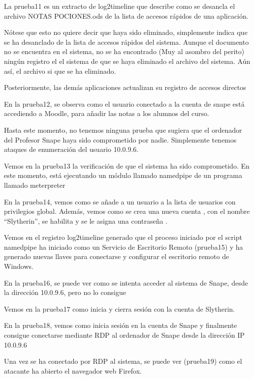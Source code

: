 La prueba11 es un extracto de log2timeline que describe como se desancla el archivo NOTAS POCIONES.ods de la lista de accesos rápidos de una aplicación.

Nótese que esto no quiere decir que haya sido eliminado, simplemente indica que se ha desanclado de la lista de accesos rápidos del sistema. 
Aunque el documento no se encuentra en el sistema, no se ha encontrado (Muy al asombro del perito) ningún registro el el sistema de que se haya eliminado el archivo del sistema. Aún así, el archivo si que se ha eliminado.

Posteriormente, las demás aplicaciones actualizan su registro de accesos directos \cite{813711}

En la prueba12, se observa como el usuario conectado a la cuenta de snape está accediendo a Moodle, para añadir las notas a los alumnos del curso.

Hasta este momento, no tenemos ninguna prueba que sugiera que el ordenador del Profesor Snape haya sido comprometido por nadie.
Simplemente tenemos ataques de enumeración del usuario 10.0.9.6.

Vemos en la prueba13 la verificación de que el sistema ha sido comprometido.
En este momento, está ejecutando un módulo llamado namedpipe \cite{namedpipe} de un programa llamado meterpreter \cite{meterpreter}

En la prueba14, vemos como se añade a un usuario a la lista de usuarios con privilegios global. \cite{4728}
Además, vemos como se crea una nueva cuenta \cite{4720}, con el nombre ``Slytherin'', se habilita \cite{4722} y se le asigna una contraseña \cite{4724}.

Vemos en el registro log2timeline generado que el proceso iniciado por el script namedpipe ha iniciado como un Servicio de Escritorio Remoto (prueba15) y ha generado nuevas llaves para conectarse y configurar el escritorio remoto de Windows.

En la prueba16, se puede ver como se intenta acceder al sistema de Snape, desde la dirección 10.0.9.6, pero no lo consigue

Vemos en la prueba17 como inicia y cierra sesión con la cuenta de Slytherin.

En la prueba18, vemos como inicia sesión en la cuenta de Snape y finalmente consigue conectarse mediante \gls{RDP} al ordenador de Snape desde la dirección \gls{IP} 10.0.9.6

Una vez se ha conectado por \gls{RDP} al sistema, se puede ver (prueba19) como el atacante ha abierto el navegador web Firefox.

